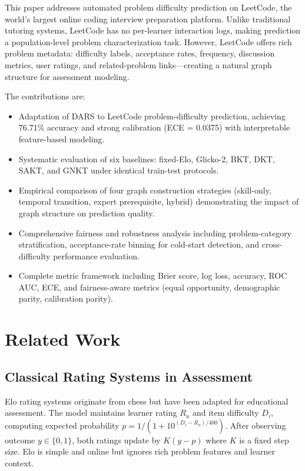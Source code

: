 \documentclass[conference]{IEEEtran}
\begin{document}
This paper addresses automated problem difficulty prediction on LeetCode, the world's largest online coding interview preparation platform. Unlike traditional tutoring systems, LeetCode has no per-learner interaction logs, making prediction a population-level problem characterization task. However, LeetCode offers rich problem metadata: difficulty labels, acceptance rates, frequency, discussion metrics, user ratings, and related-problem links—creating a natural graph structure for assessment modeling.

The contributions are:
\begin{itemize}
    \item Adaptation of DARS to LeetCode problem-difficulty prediction, achieving 76.71\% accuracy and strong calibration (ECE = 0.0375) with interpretable feature-based modeling.
    \item Systematic evaluation of six baselines: fixed-Elo, Glicko-2, BKT, DKT, SAKT, and GNKT under identical train-test protocols.
    \item Empirical comparison of four graph construction strategies (skill-only, temporal transition, expert prerequisite, hybrid) demonstrating the impact of graph structure on prediction quality.
    \item Comprehensive fairness and robustness analysis including problem-category stratification, acceptance-rate binning for cold-start detection, and cross-difficulty performance evaluation.
    \item Complete metric framework including Brier score, log loss, accuracy, ROC AUC, ECE, and fairness-aware metrics (equal opportunity, demographic parity, calibration parity).
\end{itemize}

\section{Related Work}

\subsection{Classical Rating Systems in Assessment}
Elo rating systems originate from chess but have been adapted for educational assessment. The model maintains learner rating $R_u$ and item difficulty $D_i$, computing expected probability $p = 1/(1 + 10^{(D_i - R_u)/400})$. After observing outcome $y \in \{0,1\}$, both ratings update by $K(y - p)$ where $K$ is a fixed step size. Elo is simple and online but ignores rich problem features and learner context.
\end{document}
